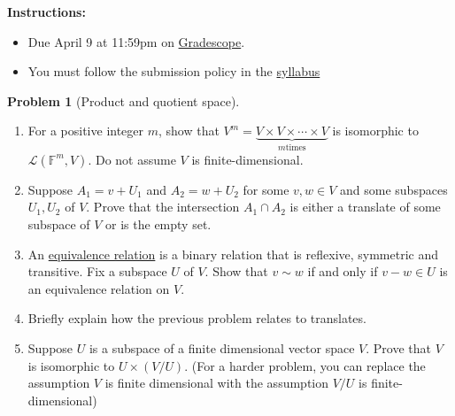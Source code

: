 \documentclass[12pt]{article}
\theoremstyle{definition}
\newtheorem{problem}{Problem}
\begin{document}
\textbf{\Large{}}
    
\vspace{-1.8em}
\hrulefill

\textbf{Instructions:}
    \begin{itemize}
        \item Due April 9 at 11:59pm on \href{https://www.gradescope.com/courses/709136}{Gradescope}.
        \item You must follow the submission policy in the \href{https://courses.chen.pw/la_s2024/syllabus.html}{syllabus} 
\end{itemize}
   
\vspace{.5em}

\begin{problem}[Product and quotient space]~
    \begin{enumerate}
        \item For a positive integer $m$, show that $V^m = \underbrace{V\times V \times \cdots \times V}_{m\text{times}}$ is isomorphic to $\mathcal{L}(\mathbb{F}^m,V)$. Do not assume $V$ is finite-dimensional.
        \item Suppose $A_1=v+U_1$ and $A_2=w+U_2$ for some $v, w \in V$ and some subspaces $U_1, U_2$ of $V$. Prove that the intersection $A_1 \cap A_2$ is either a translate of some subspace of $V$ or is the empty set.
        \item An \href{https://en.wikipedia.org/wiki/Equivalence_relation}{equivalence relation} is a binary relation that is reflexive, symmetric and transitive. Fix a subspace $U$ of $V$. Show that $v\sim w$ if and only if $v-w\in U$ is an equivalence relation on $V$.
        \item Briefly explain how the previous problem relates to translates.
        \item Suppose $U$ is a subspace of a finite dimensional vector space $V$. Prove that $V$ is isomorphic to $U \times(V / U)$. (For a harder problem, you can replace the assumption $V$ is finite dimensional with the assumption $V / U$ is finite-dimensional)
    \end{enumerate}
    \end{problem}
\end{document}
